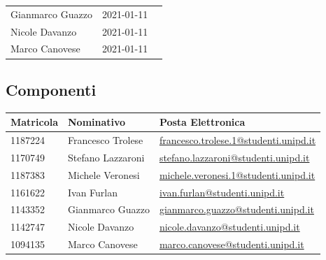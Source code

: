\begin{center}
\begin{longtable}{p{4cm}|p{4cm}|p{6cm}}
		\newline Gianmarco Guazzo  & 2021-01-11 & \newline \newline \\
		\newline Nicole Davanzo    & 2021-01-11 & \newline \newline \\
		\newline Marco Canovese    & 2021-01-11 & \newline \newline \\
	\end{longtable}
\end{center}

\subsection{Componenti}
\begin{center}

	\begin{longtable}{p{4cm}|p{4cm}|p{6cm}}
		\arrayrulecolor{white}
		\hline
		\rowcolor{lighter-grayer}
		\textbf{Matricola}  &
		\textbf{Nominativo} &
		\textbf{Posta Elettronica}                                              \\
		\hline
		1187224             & Francesco Trolese & \href{mailto:francesco.trolese.1@studenti.unipd.it}{francesco.trolese.1@studenti.unipd.it} \\
		1170749             & Stefano Lazzaroni & \href{mailto:stefano.lazzaroni@studenti.unipd.it}{stefano.lazzaroni@studenti.unipd.it} \\
		1187383             & Michele Veronesi  & \href{mailto:michele.veronesi.1@studenti.unipd.it}{michele.veronesi.1@studenti.unipd.it}\\
		1161622             & Ivan Furlan       & \href{mailto:ivan.furlan@studenti.unipd.it}{ivan.furlan@studenti.unipd.it} \\
		1143352             & Gianmarco Guazzo  & \href{mailto:gianmarco.guazzo@studenti.unipd.it}{gianmarco.guazzo@studenti.unipd.it} \\
		1142747             & Nicole Davanzo    & \href{mailto:nicole.davanzo@studenti.unipd.it}{nicole.davanzo@studenti.unipd.it} \\
		1094135             & Marco Canovese    & \href{mailto:marco.canovese@studenti.unipd.it}{marco.canovese@studenti.unipd.it} \\
	\end{longtable}
\end{center}
